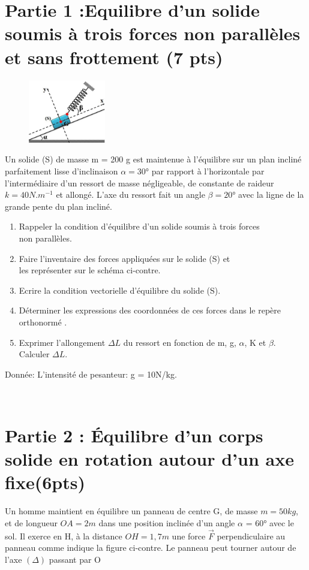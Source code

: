 \documentclass[12pt]{article}
\begin{document}
 \section*{Partie 1 :Equilibre d’un solide soumis à trois forces non parallèles et sans frottement \dotfill(7 pts)}
 \begin{figure}
	 \vspace{-1cm} 
    \includegraphics[width=0.3\textwidth]{./force_ing.png}
\end{figure}
Un solide (S) de masse m = 200 g est maintenue à l’équilibre
sur un plan incliné parfaitement lisse d’inclinaison $\alpha= 30$° par
rapport à l’horizontale par l’intermédiaire d’un ressort de
masse négligeable, de constante de raideur $k = 40 N.m^{-1}$
et
allongé. L’axe du ressort fait un angle $\beta= 20$° avec la ligne de
la grande pente du plan incliné.
\begin{enumerate}
	\item  Rappeler la condition d’équilibre d’un solide soumis à trois
forces \\non parallèles.
\item  Faire l'inventaire des forces appliquées sur le solide (S) et
\\les représenter sur le schéma ci-contre.
\item  Ecrire la condition vectorielle d'équilibre du solide (S).
\item  Déterminer les expressions des coordonnées de ces forces dans le repère orthonormé .
\item  Exprimer l’allongement $\Delta{L}$ du ressort en fonction de m, g, $\alpha$, K et $\beta$. Calculer $\Delta{L}$.
\end{enumerate}

	Donnée: L'intensité de pesanteur: g = 10N/kg.


 \vspace{3cm}

\hrulefill\\
\section*{Partie 2 : Équilibre d'un corps solide en rotation autour d'un axe fixe\dotfill(6pts)}
Un homme maintient en équilibre un panneau de centre G, de
masse $m = 50kg$, et de longueur $OA = 2m$ dans une position
inclinée d’un angle $\alpha$ = 60° avec le sol. Il exerce en H, à la
distance $OH = 1,7m$ une force $\vec{F}$ perpendiculaire au panneau
comme indique la figure ci-contre. Le panneau peut tourner
autour de l’axe $(\Delta)$ passant par O
\end{document}
